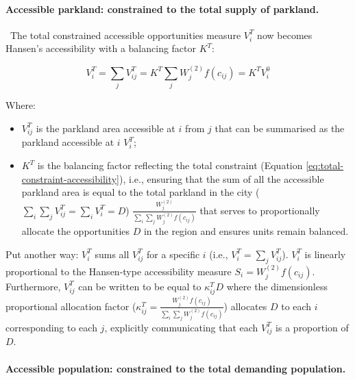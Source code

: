 \documentclass[
11pt, %
oneside, %
english, %
singlespacing, %
]{macthesis} %
\def\tightlist{}
\begin{document}
\paragraph{Accessible parkland: constrained to the total supply of parkland.}\label{accessible-parkland-constrained-to-the-total-supply-of-parkland.}

~The total constrained accessible opportunities measure \(V^T_{i}\) now becomes Hansen's accessibility with a balancing factor \(K^T\):

\begin{equation}
\label{eq:total-constrained-accessibility-park}
V^T_i = \sum_j V^T_{ij} = K^T \sum_j W^{(2)}_j f(c_{ij}) = K^T V^0_i
\end{equation} 

Where:

\begin{itemize}
\tightlist
\item
  \(V^T_{ij}\) is the parkland area accessible at \(i\) from \(j\) that can be summarised as the parkland accessible at \(i\) \(V^T_{i}\);
\item
  \(K^T\) is the balancing factor reflecting the total constraint (Equation \ref{eq:total-constraint-accessibility}), i.e., ensuring that the sum of all the accessible parkland area is equal to the total parkland in the city (\(\sum_i\sum_j V^T_{ij} = \sum_i V^T_{i} = D\)) \(\frac{W^{(2)}_j}{\sum_i\sum_j W^{(2)}_jf(c_{ij})}\) that serves to proportionally allocate the opportunities \(D\) in the region and ensures units remain balanced.
\end{itemize}

Put another way: \(V^T_i\) sums all \(V^T_{ij}\) for a specific \(i\) (i.e., \(V^T_i = \sum_j V^T_{ij}\)). \(V^T_i\) is linearly proportional to the Hansen-type accessibility measure \(S_i = W^{(2)}_jf(c_{ij})\). Furthermore, \(V_{ij}^T\) can be written to be equal to \(\kappa_{ij}^T D\) where the dimensionless proportional allocation factor (\(\kappa_{ij}^T = \frac{W_j^{(2)} f(c_{ij})}{\sum_i\sum_j W^{(2)}_jf(c_{ij})}\)) allocates \(D\) to each \(i\) corresponding to each \(j\), explicitly communicating that each \(V_{ij}^T\) is a proportion of \(D\).

\paragraph{Accessible population: constrained to the total demanding population.}\label{accessible-population-constrained-to-the-total-demanding-population.}
\end{document}
